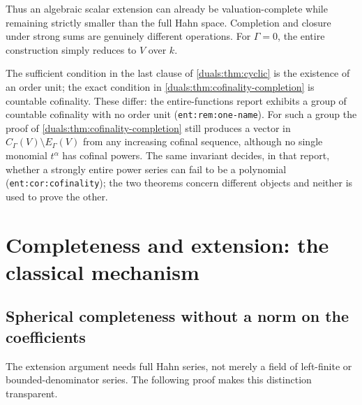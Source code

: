 \documentclass[11pt,letterpaper]{article}
\numberwithin{equation}{section}
\theoremstyle{definition}
\theoremstyle{remark}
\newcommand{\lab}[1]{\texttt{#1}}
\begin{document}
Thus an algebraic scalar extension can already be valuation-complete
while remaining strictly smaller than the full Hahn space. Completion
and closure under strong sums are genuinely different operations.
For $\Gamma=0$, the entire construction simply reduces to $V$ over $k$.

\begin{remark}
\label{duals:rem:order-unit}
The sufficient condition in the last clause of \cref{duals:thm:cyclic} is
the existence of an order unit; the exact condition in
\cref{duals:thm:cofinality-completion} is countable cofinality. These
differ: the entire-functions report exhibits a group of countable
cofinality with no order unit (\lab{ent:rem:one-name}). For such a group
the proof of \cref{duals:thm:cofinality-completion} still produces a vector
in $C_\Gamma(V)\setminus E_\Gamma(V)$ from any increasing cofinal
sequence, although no single monomial $t^\alpha$ has cofinal powers. The
same invariant decides, in that report, whether a strongly entire power
series can fail to be a polynomial (\lab{ent:cor:cofinality}); the two
theorems concern different objects and neither is used to prove the other.
\end{remark}

\section{Completeness and extension: the classical mechanism}
\label{duals:sec:extension}

\subsection{Spherical completeness without a norm on the coefficients}
The extension argument needs full Hahn series, not merely a field of
left-finite or bounded-denominator series. The following proof makes
this distinction transparent.
\end{document}
